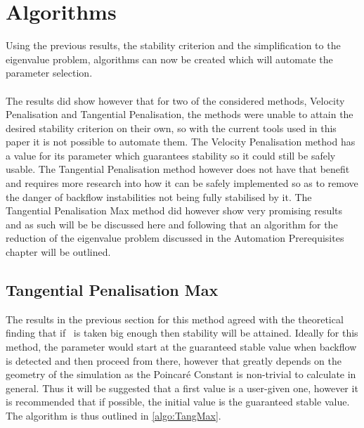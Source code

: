 

\section{Algorithms}

Using the previous results, the stability criterion and the simplification to the eigenvalue problem, algorithms can now be created which will automate the parameter selection.\\
\\
The results did show however that for two of the considered methods, Velocity Penalisation and Tangential Penalisation, the methods were unable to attain the desired stability criterion on their own, so with the current tools used in this paper it is not possible to automate them. The Velocity Penalisation method has a value for its parameter which guarantees stability so it could still be safely usable. The Tangential Penalisation method however does not have that benefit and requires more research into how it can be safely implemented so as to remove the danger of backflow instabilities not being fully stabilised by it. The Tangential Penalisation Max method did however show very promising results and as such will be be discussed here and following that an algorithm for the reduction of the eigenvalue problem discussed in the Automation Prerequisites chapter will be outlined.

\subsection{Tangential Penalisation Max}

The results in the previous section for this method agreed with the theoretical finding that if \mgamma~is taken big enough then stability will be attained. Ideally for this method, the parameter would start at the guaranteed stable value when backflow is detected and then proceed from there, however that greatly depends on the geometry of the simulation as the Poincar\'e Constant is non-trivial to calculate in general. Thus it will be suggested that a first value is a user-given one, however it is recommended that if possible, the initial value is the guaranteed stable value. The algorithm is thus outlined in \autoref{algo:TangMax}.

